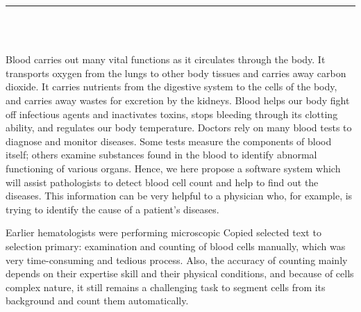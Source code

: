 \pagestyle{myfancy}

\vspace*{-0.2in}

\setcounter{page}{1}

\begin{center}
    {\color{Black} \rule{6.2in}{1.4mm} }\\
    \vspace{0.1in}
    \scshape{\fontsize{34}{46}{\bfseries{\color{Black}{Introduction}}}}
    \\
    \vspace{0.5in}
\end{center}
\hspace*{0.16in}

Blood carries out many vital functions as it circulates through the body. It transports oxygen from the lungs to other body tissues and carries away carbon dioxide. It carries nutrients from the digestive system to the cells of the body, and carries away wastes for excretion by the kidneys. Blood helps our body fight off infectious agents and inactivates toxins, stops bleeding through its clotting ability, and regulates our body temperature. Doctors rely on many blood tests to diagnose and monitor diseases. Some tests measure the components of blood itself; others examine substances found in the blood to identify abnormal functioning of various organs. Hence, we here propose a software system which will assist pathologists to detect blood cell count and help to find out the diseases. This information can be very helpful to a physician who, for example, is trying to identify the cause of a patient's diseases.

Earlier hematologists were performing microscopic Copied selected text to selection primary: examination and counting of blood cells manually, which was very time-consuming and tedious process. Also, the accuracy of counting mainly depends on their expertise skill and their physical conditions, and because of cells complex nature, it still remains a challenging task to segment cells from its background and count them automatically.

